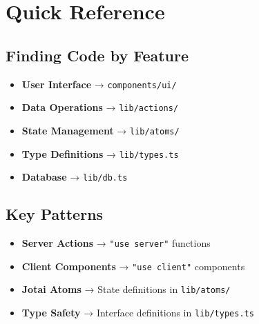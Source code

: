 \documentclass[11pt,twoside,openright]{book}
\newcommand{\filepath}[1]{\texttt{#1}}
\begin{document}
\appendix

\chapter{Quick Reference}

\section{Finding Code by Feature}
\begin{itemize}
    \item \textbf{User Interface} → \filepath{components/ui/}
    \item \textbf{Data Operations} → \filepath{lib/actions/}
    \item \textbf{State Management} → \filepath{lib/atoms/}
    \item \textbf{Type Definitions} → \filepath{lib/types.ts}
    \item \textbf{Database} → \filepath{lib/db.ts}
\end{itemize}

\section{Key Patterns}
\begin{itemize}
    \item \textbf{Server Actions} → \texttt{"use server"} functions
    \item \textbf{Client Components} → \texttt{"use client"} components
    \item \textbf{Jotai Atoms} → State definitions in \filepath{lib/atoms/}
    \item \textbf{Type Safety} → Interface definitions in \filepath{lib/types.ts}
\end{itemize}
\end{document}
